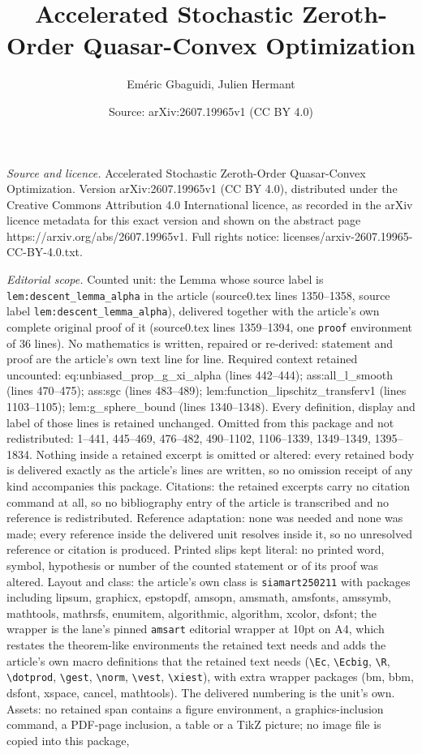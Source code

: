\documentclass[10pt,a4paper]{amsart}
\title[Accelerated Stochastic Zeroth-Order Quasar-Convex Optimizati]{Accelerated Stochastic Zeroth-Order Quasar-Convex Optimization}
\author{Em\'eric Gbaguidi, Julien Hermant}
\date{Source: arXiv:2607.19965v1 (CC BY 4.0)}
\begin{document}
\maketitle

\noindent\emph{Source and licence.} Accelerated Stochastic Zeroth-Order Quasar-Convex Optimization. Version arXiv:2607.19965v1 (CC BY 4.0), distributed under the Creative Commons Attribution 4.0 International licence, as recorded in the arXiv licence metadata for this exact version and shown on the abstract page https://arxiv.org/abs/2607.19965v1. Full rights notice: licenses/arxiv-2607.19965-CC-BY-4.0.txt.\par\smallskip

\noindent\textit{Editorial scope.} Counted unit: the Lemma whose source label is \texttt{lem:descent\_lemma\_alpha} in the article (source0.tex lines 1350--1358, source label \texttt{lem:descent\_lemma\_alpha}), delivered together with the article's own complete original proof of it (source0.tex lines 1359--1394, one \texttt{proof} environment of 36 lines). No mathematics is written, repaired or re-derived: statement and proof are the article's own text line for line. Required context retained uncounted: eq:unbiased\_prop\_g\_xi\_alpha (lines 442--444); ass:all\_l\_smooth (lines 470--475); ass:sgc (lines 483--489); lem:function\_lipschitz\_transferv1 (lines 1103--1105); lem:g\_sphere\_bound (lines 1340--1348). Every definition, display and label of those lines is retained unchanged. Omitted from this package and not redistributed: 1--441, 445--469, 476--482, 490--1102, 1106--1339, 1349--1349, 1395--1834. Nothing inside a retained excerpt is omitted or altered: every retained body is delivered exactly as the article's lines are written, so no omission receipt of any kind accompanies this package. Citations: the retained excerpts carry no citation command at all, so no bibliography entry of the article is transcribed and no reference is redistributed. Reference adaptation: none was needed and none was made; every reference inside the delivered unit resolves inside it, so no unresolved reference or citation is produced. Printed slips kept literal: no printed word, symbol, hypothesis or number of the counted statement or of its proof was altered. Layout and class: the article's own class is \texttt{siamart250211} with packages including lipsum, graphicx, epstopdf, amsopn, amsmath, amsfonts, amssymb, mathtools, mathrsfs, enumitem, algorithmic, algorithm, xcolor, dsfont; the wrapper is the lane's pinned \texttt{amsart} editorial wrapper at 10pt on A4, which restates the theorem-like environments the retained text needs and adds the article's own macro definitions that the retained text needs (\texttt{\textbackslash Ec}, \texttt{\textbackslash Ecbig}, \texttt{\textbackslash R}, \texttt{\textbackslash dotprod}, \texttt{\textbackslash gest}, \texttt{\textbackslash norm}, \texttt{\textbackslash vest}, \texttt{\textbackslash xiest}), with extra wrapper packages (bm, bbm, dsfont, xspace, cancel, mathtools). The delivered numbering is the unit's own. Assets: no retained span contains a figure environment, a graphics-inclusion command, a PDF-page inclusion, a table or a TikZ picture; no image file is copied into this package, 
\end{document}
